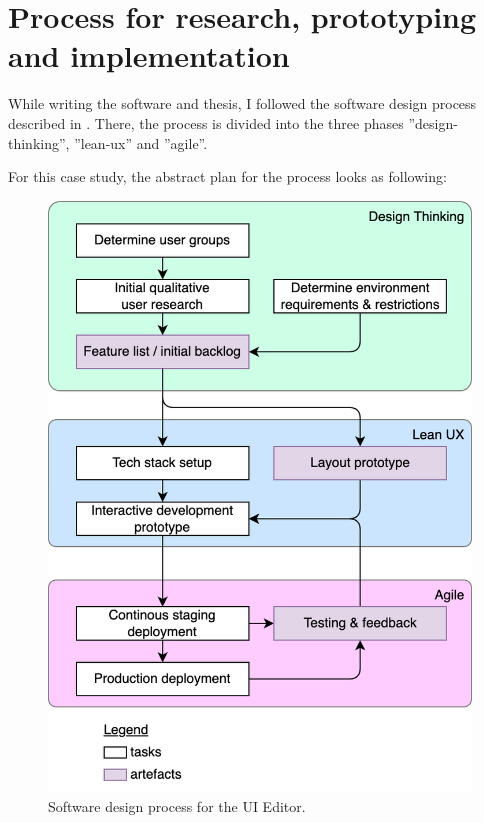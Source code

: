 \newpage
\section{Process for research, prototyping and implementation}

While writing the software and thesis, I followed the software design process described in \cite[p. 104]{LearnHCI:2020ys}.
There, the process is divided into the three phases ''\Gls{design-thinking}'', ''\Gls{lean-ux}'' and ''\Gls{agile}''.

For this case study, the abstract plan for the process looks as following:
\begin{figure}[h]
  \centering
  \includegraphics[width=0.8\linewidth]{pics/process.drawio.png}
  \caption{Software design process for the UI Editor.}
	\label{fig:process}
\end{figure}


